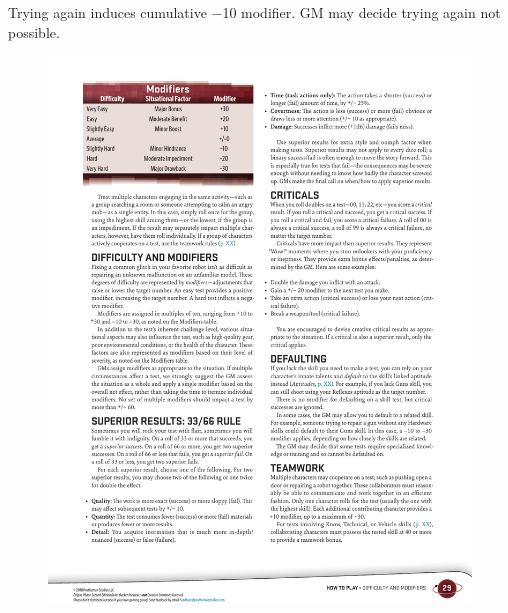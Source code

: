 \begin{itemize}
 \itembox Trying again induces cumulative \num{-10} modifier. GM may decide trying again not possible.
\end{itemize}


\begin{figure}[htb!]%
   \centering
   \includegraphics[scale=0.95]{gfx/dice-modifiers}%
\end{figure}%

